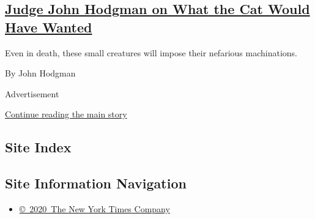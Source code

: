 \begin{enumerate}
  \hypertarget{judge-john-hodgman-on-what-the-cat-would-have-wanted}{%
  \subsection{\texorpdfstring{\href{/2017/04/21/magazine/judge-john-hodgman-on-what-the-cat-would-have-wanted.html}{Judge
  John Hodgman on What the Cat Would Have
  Wanted}}{Judge John Hodgman on What the Cat Would Have Wanted}}\label{judge-john-hodgman-on-what-the-cat-would-have-wanted}}

  Even in death, these small creatures will impose their nefarious
  machinations.

  By John Hodgman
\end{enumerate}

Advertisement

\protect\hyperlink{after-mid1}{Continue reading the main story}

\hypertarget{site-index}{%
\subsection{Site Index}\label{site-index}}

\hypertarget{site-information-navigation}{%
\subsection{Site Information
Navigation}\label{site-information-navigation}}

\begin{itemize}
\tightlist
\item
  \href{https://help.nytimes3xbfgragh.onion/hc/en-us/articles/115014792127-Copyright-notice}{©~2020~The
  New York Times Company}
\end{itemize}

